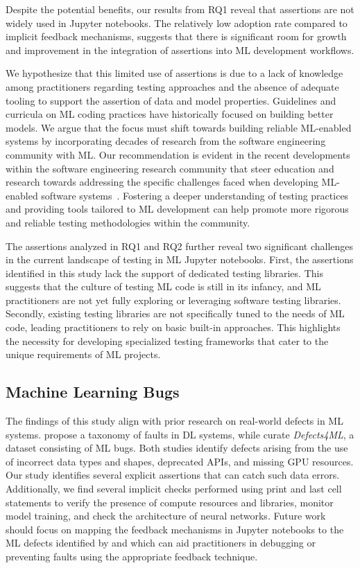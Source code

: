 \documentclass[smallextended]{svjour3}       %
\begin{document}
Despite the potential benefits, our results from RQ1 reveal that assertions are not widely used in Jupyter notebooks. The relatively low adoption rate compared to implicit feedback mechanisms, suggests that there is significant room for growth and improvement in the integration of assertions into ML development workflows.

We hypothesize that this limited use of assertions is due to a lack of knowledge among practitioners regarding testing approaches and the absence of adequate tooling to support the assertion of data and model properties. Guidelines and curricula on ML coding practices have historically focused on building better models. We argue that the focus must shift towards building reliable ML-enabled systems by incorporating decades of research from the software engineering community with ML. Our recommendation is evident in the recent developments within the software engineering research community that steer education and research towards addressing the specific challenges faced when developing ML-enabled software systems~\citep{kastner2020teaching,lanubile2021towards,lanubile2023teaching}. Fostering a deeper understanding of testing practices and providing tools tailored to ML development can help promote more rigorous and reliable testing methodologies within the community.

The assertions analyzed in RQ1 and RQ2 further reveal two significant challenges in the current landscape of testing in ML Jupyter notebooks. First, the assertions identified in this study lack the support of dedicated testing libraries. This suggests that the culture of testing ML code is still in its infancy, and ML practitioners are not yet fully exploring or leveraging software testing libraries. Secondly, existing testing libraries are not specifically tuned to the needs of ML code, leading practitioners to rely on basic built-in approaches. This highlights the necessity for developing specialized testing frameworks that cater to the unique requirements of ML projects.

\subsection{Machine Learning Bugs}

The findings of this study align with prior research on real-world defects in ML systems. \citet{humbatova2020taxonomy} propose a taxonomy of faults in DL systems, while \citet{morovati2023bugs} curate \emph{Defects4ML}, a dataset consisting of ML bugs. Both studies identify defects arising from the use of incorrect data types and shapes, deprecated APIs, and missing GPU resources. Our study identifies several explicit assertions that can catch such data errors. Additionally, we find several implicit checks performed using print and last cell statements to verify the presence of compute resources and libraries, monitor model training, and check the architecture of neural networks. Future work should focus on mapping the feedback mechanisms in Jupyter notebooks to the ML defects identified by \citet{humbatova2020taxonomy} and \citet{morovati2023bugs} which can aid practitioners in debugging or preventing faults using the appropriate feedback technique.
\end{document}
